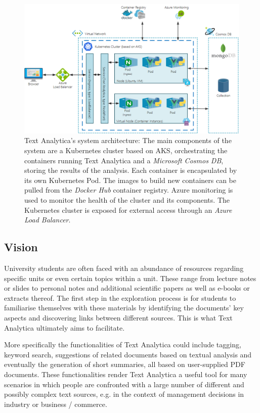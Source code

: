 \documentclass[conference]{IEEEtran}
\begin{document}
\begin{figure}[ht!]
\includegraphics[width=150mm]{img/architectur.png}
\caption{Text Analytica's system architecture: The main components of the system are a Kubernetes cluster based on AKS, orchestrating the containers running Text Analytica and a \textit{Microsoft Cosmos DB}, storing the results of the analysis. Each container is encapsulated by its own Kubernetes Pod. The images to build new containers can be pulled from the \textit{Docker Hub} container registry. Azure monitoring is used to monitor the health of the cluster and its components. The Kubernetes cluster is exposed for external access through an \textit{Azure Load Balancer}.}
\label{img:architecture}
\end{figure}

\subsection{Vision}
University students are often faced with an abundance of resources regarding specific units or even certain topics within a unit. These range from lecture notes or slides to personal notes and additional scientific papers as well as e-books or extracts thereof. The first step in the exploration process is for students to familiarise themselves with these materials by identifying the documents' key aspects and discovering links between different sources. This is what Text Analytica ultimately aims to facilitate.

More specifically the functionalities of Text Analytica could include tagging, keyword search, suggestions of related documents based on textual analysis and eventually the generation of short summaries, all based on user-supplied PDF documents. These functionalities render Text Analytica a useful tool for many scenarios in which people are confronted with a large number of different and possibly complex text sources, e.g. in the context of management decisions in industry or business / commerce.
\end{document}

